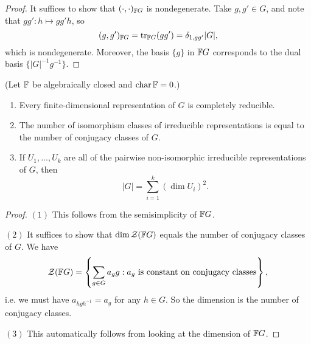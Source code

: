 \begin{proof}
  It suffices to show that
  $(\cdot, \cdot)_{\mathbb{F} G}$ is nondegenerate.
  Take $g, g' \in G$, and note
  that $gg' : h \mapsto gg' h$, so
  \[
    (g, g')_{\mathbb{F} G}
    = \operatorname{tr}_{\mathbb{F} G}(gg') = \delta_{1, gg'} |G|,
  \]
  which is nondegenerate.
  Moreover,
  the basis $\{g\}$ in $\mathbb{F} G$
  corresponds to the dual basis
  $\{|G|^{-1}g^{-1}\}$.
\end{proof}

\begin{corollary}
  (Let $\mathbb{F}$ be algebraically closed
  and $\operatorname{char} \mathbb{F} = 0$.)
  \begin{enumerate}
    \item Every finite-dimensional
      representation of $G$ is completely
      reducible.
    \item The number of isomorphism classes
      of irreducible representations
      is equal to the number of conjugacy
      classes of $G$.
    \item If $U_1, \dots, U_k$
      are all of the pairwise
      non-isomorphic irreducible
      representations of $G$, then
      \[
        |G| = \sum_{i = 1}^k (\dim U_i)^2.
      \]
  \end{enumerate}
\end{corollary}

\begin{proof}
  $(1)$ This follows from the semisimplicity
  of $\mathbb{F} G$.

  $(2)$ It suffices to show that
  $\dim \mathcal{Z}(\mathbb{F} G)$ equals the
  number of conjugacy classes of $G$.
  We have
  \[
    \mathcal{Z}(\mathbb{F} G)
    = \left\{
      \sum_{g \in G} a_g g :
      a_g \text{ is constant on conjugacy classes}
    \right\},
  \]
  i.e. we must have
  $a_{hgh^{-1}} = a_g$ for any
  $h \in G$. So the dimension is
  the number of conjugacy classes.
  
  $(3)$ This automatically follows
  from looking at the dimension of
  $\mathbb{F} G$.
\end{proof}

